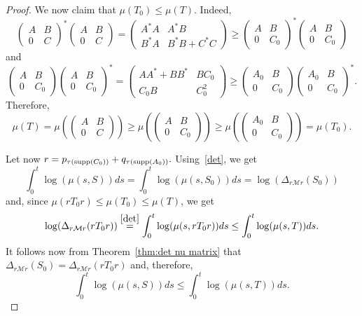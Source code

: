 \documentclass{amsart}
\theoremstyle{plain}
\theoremstyle{remark}
\begin{document}
\begin{proof}
We now claim that $\mu(T_0)\leq\mu(T).$ Indeed,
$$\begin{pmatrix}
A&B\\
0&C
\end{pmatrix}^*\begin{pmatrix}
A&B\\
0&C
\end{pmatrix}=\begin{pmatrix}
A^*A&A^*B\\
B^*A&B^*B+C^*C
\end{pmatrix}\geq\begin{pmatrix}
A&B\\
0&C_0
\end{pmatrix}^*\begin{pmatrix}
A&B\\
0&C_0
\end{pmatrix}$$
and
$$\begin{pmatrix}
A&B\\
0&C_0
\end{pmatrix}\begin{pmatrix}
A&B\\
0&C_0
\end{pmatrix}^*=\begin{pmatrix}
AA^*+BB^*&BC_0\\
C_0B&C_0^2
\end{pmatrix}\geq\begin{pmatrix}
A_0&B\\
0&C_0
\end{pmatrix}\begin{pmatrix}
A_0&B\\
0&C_0
\end{pmatrix}^*.$$
Therefore,
$$\mu(T)=\mu(\begin{pmatrix}
A&B\\
0&C
\end{pmatrix})\geq \mu(\begin{pmatrix}
A&B\\
0&C_0
\end{pmatrix})\geq\mu(\begin{pmatrix}
A_0&B\\
0&C_0
\end{pmatrix})=\mu(T_0).$$

Let now $r=p_{\tau({\rm supp}(C_0))}+q_{\tau({\rm supp}(A_0))}.$ Using~\eqref{det}, we get
$$\int_0^t\log(\mu(s,S))ds=\int_0^t\log(\mu(s,S_0))ds=\log(\Delta_{r\mathcal{M}r}(S_0))$$
and, since $\mu(rT_0r)\le\mu(T_0)\le\mu(T)$, we get
$$\log(\Delta_{r\mathcal{M}r}(rT_0r))\stackrel{\eqref{det}}{=}\int_0^t\log(\mu(s,rT_0r))ds\leq \int_0^t\log(\mu(s,T))ds.$$
It follows now from Theorem~\ref{thm:det nu matrix} that $\Delta_{r\mathcal{M}r}(S_0)=\Delta_{r\mathcal{M}r}(rT_0r)$ and, therefore,
$$\int_0^t\log(\mu(s,S))ds\leq\int_0^t\log(\mu(s,T))ds.$$
\end{proof}
\end{document}
